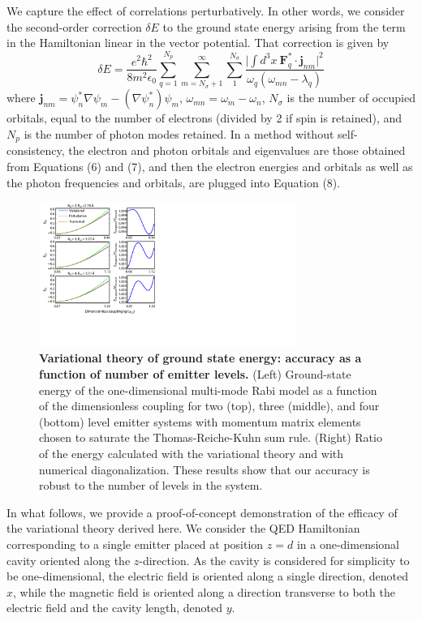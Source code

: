 \documentclass[aps,prl,twocolumn,
	groupedaddress,superscriptaddress,
	amsfonts,amssymb,amsmath,floatfix,
	citeautoscript]{revtex4-1}
\begin{document}
We capture the effect of correlations perturbatively. In other words, we consider the second-order correction $\delta E$ to the ground state energy arising from the term in the Hamiltonian linear in the vector potential. That correction is given by 
\begin{equation}
\delta E = \frac{e^2\hbar^2}{8m^2\epsilon_0}\sum\limits_{q=1}^{N_p}\sum_{m=N_{\sigma}+1}^{\infty}\sum\limits_{1}^{N_{\sigma}} \frac{\Big| \int d^3x~\mathbf{F}_q^*\cdot\mathbf{j}_{nm}\Big|^2}{\omega_q(\omega_{mn} -\lambda_q)}
\end{equation}
where $\mathbf{j}_{nm} = \psi^*_n\nabla\psi_m - (\nabla\psi^*_n)\psi_m$, $\omega_{mn} = \omega_m - \omega_n$, $N_{\sigma}$ is the number of occupied orbitals, equal to the number of electrons (divided by 2 if spin is retained), and $N_p$ is the number of photon modes retained.  In a method without self-consistency, the electron and photon orbitals and eigenvalues are those obtained from Equations (6) and (7), and then the electron energies and orbitals as well as the photon frequencies and orbitals, are plugged into Equation (8).
\begin{figure}[t]
\includegraphics[width=8.4cm]{figure3new.pdf}
\caption{\textbf{Variational theory of ground state energy: accuracy as a function of number of emitter levels.} (Left) Ground-state energy of the one-dimensional multi-mode Rabi model as a function of the dimensionless coupling for two (top), three (middle), and four (bottom) level emitter systems with momentum matrix elements chosen to saturate the Thomas-Reiche-Kuhn sum rule. (Right) Ratio of the energy calculated with the variational theory and with numerical diagonalization. These results show that our accuracy is robust to the number of levels in the system. }
\label{fig:ansatz}
\end{figure}
In what follows, we provide a proof-of-concept demonstration of the efficacy of the variational theory derived here. We consider the QED Hamiltonian corresponding to a single emitter placed at position $z=d$ in a one-dimensional cavity oriented along the $z$-direction. As the cavity is considered for simplicity to be one-dimensional, the electric field is oriented along a single direction, denoted $x$, while the magnetic field is oriented along a direction transverse to both the electric field and the cavity length, denoted $y$.
\end{document}
